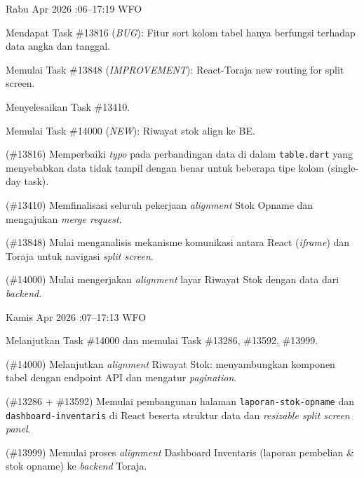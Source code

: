 \begin{logtable}
    {
        Rabu  Apr 2026 :06--17:19 \linebreak %
        WFO
    }{
        \begin{loglist}
            \item Mendapat Task \#13816 (\textit{BUG}): Fitur sort kolom tabel hanya berfungsi
            terhadap data angka dan tanggal.
            \item Memulai Task \#13848 (\textit{IMPROVEMENT}): React-Toraja new routing for split
            screen.
            \item Menyelesaikan Task \#13410.
            \item Memulai Task \#14000 (\textit{NEW}): Riwayat stok align ke BE.
        \end{loglist}
    }{
        \begin{logwork}
            \item (\#13816) Memperbaiki \textit{typo} pada perbandingan data di dalam \texttt{table.dart} yang menyebabkan data tidak tampil dengan benar untuk beberapa tipe kolom (single-day task).
            \item (\#13410) Memfinalisasi seluruh pekerjaan \textit{alignment} Stok Opname dan mengajukan \textit{merge request}.
            \item (\#13848) Mulai menganalisis mekanisme komunikasi antara React (\textit{iframe}) dan Toraja untuk navigasi \textit{split screen}.
            \item (\#14000) Mulai mengerjakan \textit{alignment} layar Riwayat Stok dengan data dari \textit{backend}.
        \end{logwork}
    }

    {
        Kamis  Apr 2026 :07--17:13 \linebreak %
        WFO
    }{
        \begin{loglist}
            \item Melanjutkan Task \#14000 dan memulai Task \#13286, \#13592, \#13999.
        \end{loglist}
    }{
        \begin{logwork}
            \item (\#14000) Melanjutkan \textit{alignment} Riwayat Stok: menyambungkan komponen tabel dengan endpoint API dan mengatur \textit{pagination}.
            \item (\#13286 + \#13592) Memulai pembangunan halaman \texttt{laporan-stok-opname} dan \texttt{dashboard-inventaris} di React beserta struktur data dan \textit{resizable split screen panel}.
            \item (\#13999) Memulai proses \textit{alignment} Dashboard Inventaris (laporan pembelian \& stok opname) ke \textit{backend} Toraja.
        \end{logwork}
    }


\end{logtable}
